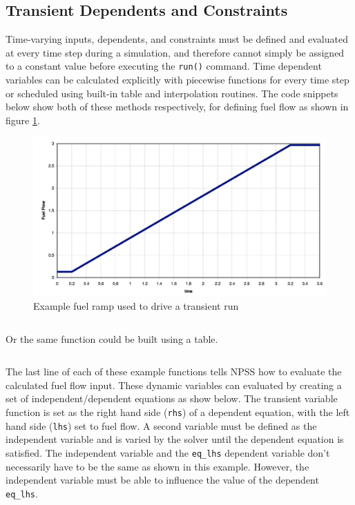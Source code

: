 \documentclass[heading.tex]{subfiles}
\begin{document}
\subsection{Transient Dependents and Constraints}

Time-varying inputs, dependents, and constraints must be defined and evaluated at every time step during a simulation, and therefore cannot simply be
assigned to a constant value before executing the \texttt{run()} command. Time dependent variables can be calculated explicitly with
piecewise functions for every time step or scheduled using built-in table and interpolation routines.
The code snippets below show both of these methods respectively, for defining fuel flow as shown in figure \ref{f:ramp}.

\begin{figure}[H]
\centering
\includegraphics[width=1.0\textwidth]{images/fuelRamp}
\caption{Example fuel ramp used to drive a transient run}
\label{f:ramp}
\end{figure}

\begin{adjustwidth}{-1cm}{-1cm}
 \inputminted[]{c++}{code/rampFn}
 \end{adjustwidth} 
 
Or the same function could be built using a table. 
 
 \begin{adjustwidth}{-1cm}{-1cm}
 \inputminted[]{c++}{code/rampTb}
 \end{adjustwidth} 

The last line of each of these example functions tells NPSS how to evaluate the calculated fuel flow input.
These dynamic variables can evaluated by creating a set of independent/dependent equations as show below.
The transient variable function is set as the right hand side (\texttt{rhs}) of a dependent equation,
with the left hand side (\texttt{lhs}) set to fuel flow. 
A second variable must be defined as the independent variable and is varied by the solver until the dependent
equation is satisfied.
The independent variable and the \texttt{eq\_lhs} dependent variable don't necessarily have to be the same
as shown in this example. However, the independent variable must be able to influence the
value of the dependent \texttt{eq\_lhs}.
\end{document}
